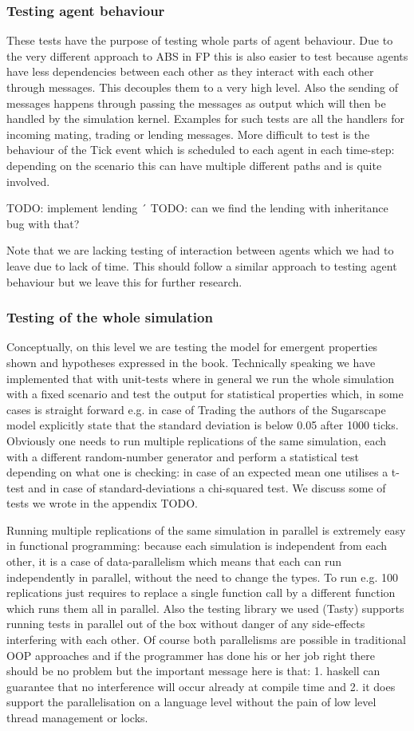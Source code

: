 \subsubsection{Testing agent behaviour}
These tests have the purpose of testing whole parts of agent behaviour. Due to the very different approach to ABS in FP this is also easier to test because agents have less dependencies between each other as they interact with each other through messages. This decouples them to a very high level. Also the sending of messages happens through passing the messages as output which will then be handled by the simulation kernel. Examples for such tests are all the handlers for incoming mating, trading or lending messages. More difficult to test is the behaviour of the Tick event which is scheduled to each agent in each time-step: depending on the scenario this can have multiple different paths and is quite involved.

TODO: implement lending
´
TODO: can we find the lending with inheritance bug with that?

Note that we are lacking testing of interaction between agents which we had to leave due to lack of time. This should follow a similar approach to testing agent behaviour but we leave this for further research.

\subsubsection{Testing of the whole simulation}
Conceptually, on this level we are testing the model for emergent properties shown and hypotheses expressed in the book. Technically speaking we have implemented that with unit-tests where in general we run the whole simulation with a fixed scenario and test the output for statistical properties which, in some cases is straight forward e.g. in case of Trading the authors of the Sugarscape model explicitly state that the standard deviation is below 0.05 after 1000 ticks.
Obviously one needs to run multiple replications of the same simulation, each with a different random-number generator and perform a statistical test depending on what one is checking: in case of an expected mean one utilises a t-test and in case of standard-deviations a chi-squared test. We discuss some of tests we wrote in the appendix TODO. 

Running multiple replications of the same simulation in parallel is extremely easy in functional programming: because each simulation is independent from each other, it is a case of data-parallelism which means that each can run independently in parallel, without the need to change the types. To run e.g. 100 replications just requires to replace a single function call by a different function which runs them all in parallel. Also the testing library we used (Tasty) supports running tests in parallel out of the box without danger of any side-effects interfering with each other. 
Of course both parallelisms are possible in traditional OOP approaches and if the programmer has done his or her job right there should be no problem but the important message here is that: 1. haskell can guarantee that no interference will occur already at compile time and 2. it does support the parallelisation on a language level without the pain of low level thread management or locks.
